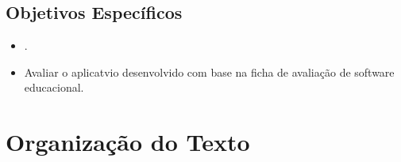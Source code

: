 \subsection{Objetivos Específicos}
\begin{itemize}
	\item .
	\item Avaliar o aplicatvio desenvolvido com base na ficha de avaliação de software educacional.
	
\end{itemize}


\section{Organização do Texto}%








